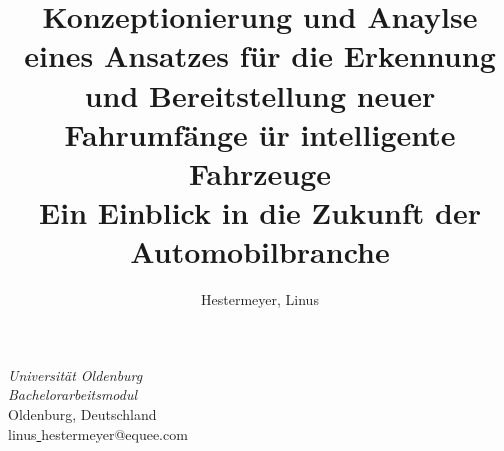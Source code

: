 \documentclass{article}
\begin{document}
\title{Konzeptionierung und Anaylse eines Ansatzes für die Erkennung und Bereitstellung neuer Fahrumfänge ür intelligente Fahrzeuge\\
{\small Ein Einblick in die Zukunft der Automobilbranche}
}

\author{Hestermeyer, Linus}
\textit{Universität Oldenburg} \\
\textit{Bachelorarbeitsmodul}\\
Oldenburg, Deutschland \\
linus\underline{ }hestermeyer@equee.com


\maketitle
\tableofcontents
\clearpage
\begin{abstract}


\end{abstract}


\end{document}
